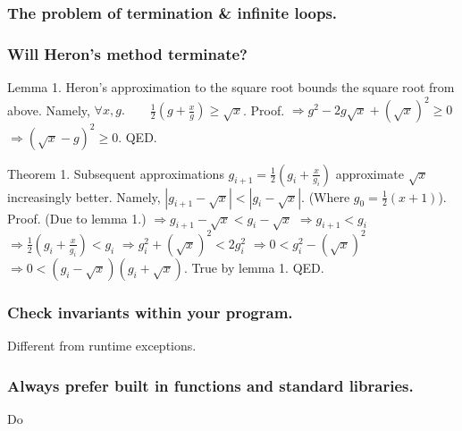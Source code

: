 \documentclass{beamer} %
\begin{document}
\begin{frame}
\frametitle{The problem of termination \& infinite loops.}
\end{frame}

\begin{frame}
\frametitle{Will Heron's method terminate?}

Lemma 1. Heron's approximation to the square root bounds the square root from above. Namely, $\forall x, g. \qquad \frac{1}{2}(g + \frac{x}{g}) \geq \sqrt{x}$.
Proof. $\Rightarrow g^2 - 2g\sqrt{x}+(\sqrt{x})^2 \geq 0$ 
$\Rightarrow (\sqrt{x} - g)^2 \geq 0$. QED.

Theorem 1. Subsequent approximations $g_{i+1} = \frac{1}{2} (g_i + \frac{x}{g_i})$ approximate $\sqrt{x}$ increasingly better. Namely, $|g_{i+1} - \sqrt{x}| < |g_{i} - \sqrt{x}|$. (Where $g_0 = \frac{1}{2}(x + 1)$).
Proof. (Due to lemma 1.) 
$\Rightarrow g_{i+1} - \sqrt{x} < g_{i} - \sqrt{x}$
$\Rightarrow g_{i+1} < g_{i}$
$\Rightarrow \frac{1}{2} (g_i + \frac{x}{g_i}) < g_{i}$
$\Rightarrow g_i^2 + (\sqrt{x})^2 < 2g_i^2$
$\Rightarrow 0 < g_i^2 - (\sqrt{x})^2$
$\Rightarrow 0 < (g_i - \sqrt{x})(g_i + \sqrt{x})$. True by lemma 1. QED.
\end{frame}


\begin{frame}
\frametitle{Check invariants within your program.}

Different from runtime exceptions.
\end{frame}



\begin{frame}
\frametitle{Always prefer built in functions and standard libraries.}

Do 

\end{frame}
\end{document}
